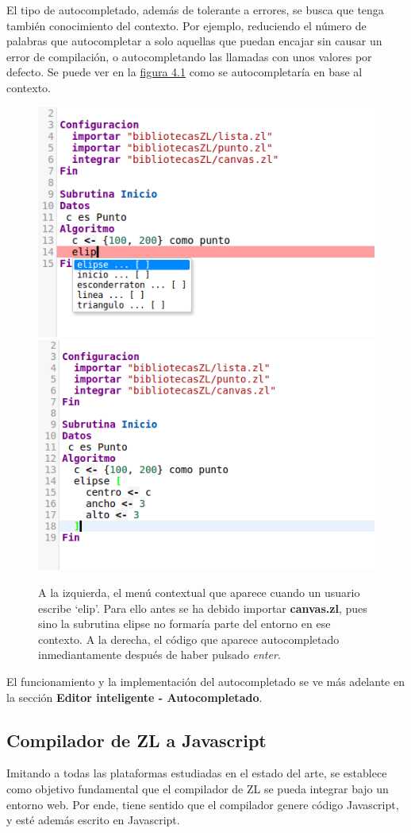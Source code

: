 \documentclass{report}
\begin{document}
	\vspace{10px}

	El tipo de autocompletado, además de tolerante a errores, se busca que tenga también conocimiento del contexto. Por ejemplo, reduciendo el número de palabras que autocompletar a solo aquellas que puedan encajar sin causar un error de compilación, o autocompletando las llamadas con unos valores por defecto. Se puede ver en la \hyperref[fig:completion]{figura 4.1} como se autocompletaría en base al contexto.
	
\begin{figure}
\centering
\includegraphics[width=0.4\linewidth]{beforecompletion}
\includegraphics[width=0.4\linewidth]{aftercompletion}
\caption[Ejemplo de autocompletado.]{A la izquierda, el menú contextual que aparece cuando un usuario escribe `elip'. Para ello antes se ha debido importar \textbf{canvas.zl}, pues sino la subrutina elipse no formaría parte del entorno en ese contexto. A la derecha, el código que aparece autocompletado inmediantamente después de haber pulsado \textit{enter}.}
\label{fig:completion}
\end{figure}
	
	El funcionamiento y la implementación del autocompletado se ve más adelante en la sección \textbf{Editor inteligente - Autocompletado}.
	
	\subsection{Compilador de ZL a Javascript}
	
	Imitando a todas las plataformas estudiadas en el estado del arte, se establece como objetivo fundamental que el compilador de ZL se pueda integrar bajo un entorno web. Por ende, tiene sentido que el compilador genere código Javascript, y esté además escrito en Javascript. 
	
\end{document}
